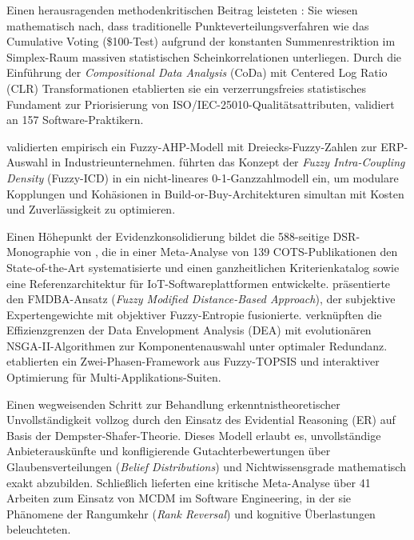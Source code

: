 Einen herausragenden methodenkritischen Beitrag leisteten \textcite{UK2X9C4W}: Sie wiesen mathematisch nach, dass traditionelle Punkteverteilungsverfahren wie das Cumulative Voting (\$100-Test) aufgrund der konstanten Summenrestriktion im Simplex-Raum massiven statistischen Scheinkorrelationen unterliegen. Durch die Einführung der \textit{Compositional Data Analysis} (CoDa) mit Centered Log Ratio (CLR) Transformationen etablierten sie ein verzerrungsfreies statistisches Fundament zur Priorisierung von ISO/IEC-25010-Qualitätsattributen, validiert an 157 Software-Praktikern.

\textcite{5BBYQCJB} validierten empirisch ein Fuzzy-AHP-Modell mit Dreiecks-Fuzzy-Zahlen zur ERP-Auswahl in Industrieunternehmen. \textcite{UFCEV52H} führten das Konzept der \textit{Fuzzy Intra-Coupling Density} (Fuzzy-ICD) in ein nicht-lineares 0-1-Ganzzahlmodell ein, um modulare Kopplungen und Kohäsionen in Build-or-Buy-Architekturen simultan mit Kosten und Zuverlässigkeit zu optimieren.

Einen Höhepunkt der Evidenzkonsolidierung bildet die 588-seitige DSR-Monographie von \textcite{RRU375GB}, die in einer Meta-Analyse von 139 COTS-Publikationen den State-of-the-Art systematisierte und einen ganzheitlichen Kriterienkatalog sowie eine Referenzarchitektur für IoT-Softwareplattformen entwickelte. \textcite{FVINCQ89} präsentierte den FMDBA-Ansatz (\textit{Fuzzy Modified Distance-Based Approach}), der subjektive Expertengewichte mit objektiver Fuzzy-Entropie fusionierte. \textcite{YVWGHAWQ} verknüpften die Effizienzgrenzen der Data Envelopment Analysis (DEA) mit evolutionären NSGA-II-Algorithmen zur Komponentenauswahl unter optimaler Redundanz. \textcite{8KF4HAZS} etablierten ein Zwei-Phasen-Framework aus Fuzzy-TOPSIS und interaktiver Optimierung für Multi-Applikations-Suiten.

Einen wegweisenden Schritt zur Behandlung erkenntnistheoretischer Unvollständigkeit vollzog \textcite{LNQHES84} durch den Einsatz des Evidential Reasoning (ER) auf Basis der Dempster-Shafer-Theorie. Dieses Modell erlaubt es, unvollständige Anbieterauskünfte und konfligierende Gutachterbewertungen über Glaubensverteilungen (\textit{Belief Distributions}) und Nichtwissensgrade mathematisch exakt abzubilden. Schließlich lieferten \textcite{LPC92LAP} eine kritische Meta-Analyse über 41 Arbeiten zum Einsatz von MCDM im Software Engineering, in der sie Phänomene der Rangumkehr (\textit{Rank Reversal}) und kognitive Überlastungen beleuchteten.

